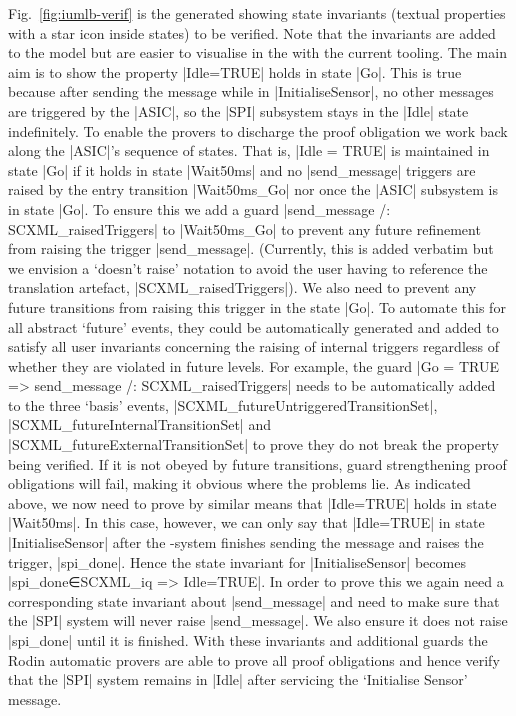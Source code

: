 Fig.~\ref{fig:iumlb-verif} is the generated \iUMLB showing state invariants (textual properties with a star icon inside states) to be verified. Note that the invariants are added to the \SCXML model but are easier to visualise in the \iUMLB with the current tooling.
The main aim is to show the property |Idle=TRUE| holds in state |Go|. 
This is true because after sending the message while in |InitialiseSensor|, no other messages are triggered by the |ASIC|, so the |SPI| subsystem stays in the |Idle| state indefinitely. 
To enable the provers to discharge the proof obligation we work back along the |ASIC|'s sequence of states. 
That is, |Idle = TRUE| is maintained in state |Go| if it holds in state |Wait50ms| and no |send_message| triggers are raised by the entry transition |Wait50ms_Go| nor once the |ASIC| subsystem is in state |Go|. 
To ensure this we add a guard |send_message /: SCXML_raisedTriggers| to |Wait50ms_Go| to prevent any future refinement from raising the trigger |send_message|.
(Currently, this is added verbatim but we envision a `doesn't raise' notation to avoid the user having to reference the translation artefact, |SCXML_raisedTriggers|).
We also need to prevent any future transitions from raising this trigger in the state |Go|.
To automate this for all abstract `future' events, they could be automatically generated and added to satisfy all user invariants concerning the raising of internal triggers regardless of whether they are violated in future levels. 
For example, the guard  |Go = TRUE => send_message /: SCXML_raisedTriggers| needs to be automatically added to the three `basis' events,
 |SCXML_futureUntriggeredTransitionSet|, |SCXML_futureInternalTransitionSet| and |SCXML_futureExternalTransitionSet| to prove they do not break the property being verified. 
If it is not obeyed by future transitions, guard strengthening proof obligations will fail, making it obvious where the problems lie.
As indicated above, we now need to prove by similar means that |Idle=TRUE| holds in state |Wait50ms|. 
In this case, however, we can only say that |Idle=TRUE| in state |InitialiseSensor| after the \SPI-system finishes sending the message and raises the trigger, |spi_done|. 
Hence the state invariant for |InitialiseSensor| becomes |spi_done∈SCXML_iq => Idle=TRUE|. 
In order to prove this we again need a corresponding state invariant about |send_message| and need to make sure that the |SPI| system will never raise |send_message|.
We also ensure it does not raise |spi_done| until it is finished. 
With these invariants and additional guards the Rodin automatic provers are able to prove all proof obligations and hence verify that the |SPI| system remains in |Idle| after servicing the `Initialise Sensor' message.

